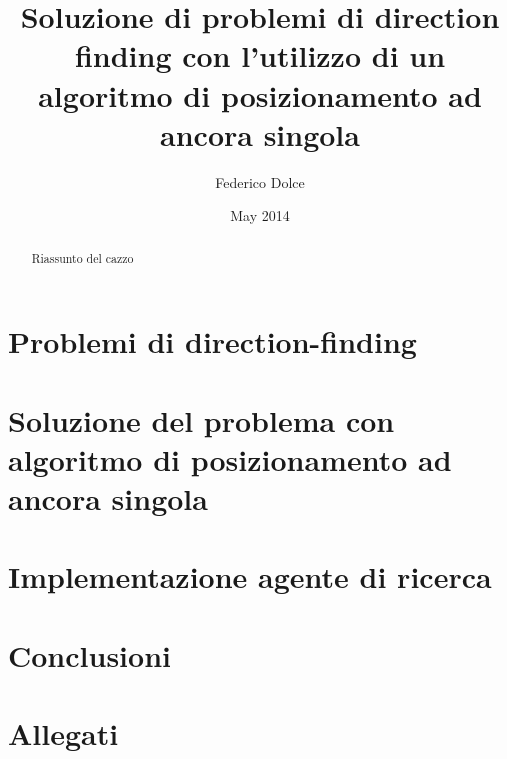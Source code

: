 \documentclass{report}
\begin{document}
\frontmatter
\title{Soluzione di problemi di direction finding con l'utilizzo di un algoritmo di posizionamento ad ancora singola}
\author{Federico Dolce}
\date{May 2014}
\maketitle
\begin{abstract}
Riassunto del cazzo
\end{abstract}
\tableofcontents
\mainmatter

\chapter{Problemi di direction-finding}
	

\chapter{Soluzione del problema con algoritmo di posizionamento ad ancora singola}
	


\chapter{Implementazione agente di ricerca}
	

\chapter{Conclusioni}
	

\appendix
\chapter{Allegati}
	
	
\end{document}
